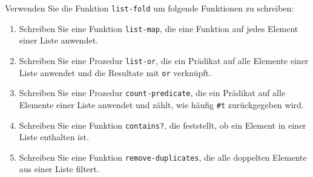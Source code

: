 \begin{aufgabe}
  Verwenden Sie die Funktion \texttt{list-fold} um folgende 
  Funktionen zu schreiben:
  \begin{enumerate}
  \item Schreiben Sie eine Funktion \texttt{list-map}, die eine Funktion auf jedes
    Element einer Liste anwendet.
  \item Schreiben Sie eine Prozedur \texttt{list-or}, die ein Prädikat auf alle
    Elemente einer Liste anwendet und die Resultate mit \texttt{or}
    verknüpft.
  \item Schreiben Sie eine Prozedur \texttt{count-predicate}, die ein Prädikat auf
    alle Elemente einer Liste anwendet und zählt, wie häufig \verb|#t|
    zurückgegeben wird.
  \item Schreiben Sie eine Funktion \texttt{contains?}, die feststellt, ob ein
    Element in einer Liste enthalten ist.
  \item Schreiben Sie eine Funktion \texttt{remove-duplicates}, die alle doppelten
    Elemente aus einer Liste filtert.
  \end{enumerate}
\end{aufgabe}

